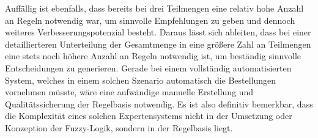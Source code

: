\documentclass[]{scrartcl}
\begin{document}
Auffällig ist ebenfalls, dass bereits bei drei Teilmengen eine relativ hohe Anzahl an Regeln notwendig war, um sinnvolle Empfehlungen zu geben und dennoch weiteres Verbesserungspotenzial besteht. Daraus lässt sich ableiten, dass bei einer detaillierteren Unterteilung der Gesamtmenge in eine größere Zahl an Teilmengen eine stets noch höhere Anzahl an Regeln notwendig ist, um beständig sinnvolle Entscheidungen zu generieren. Gerade bei einem vollständig automatisierten System, welches in einem solchen Szenario automatisch die Bestellungen vornehmen müsste, wäre eine aufwändige manuelle Erstellung und Qualitätssicherung der Regelbasis notwendig. Es ist also definitiv bemerkbar, dass die Komplexität eines solchen Expertensystems nicht in der Umsetzung oder Konzeption der Fuzzy-Logik, sondern in der Regelbasis liegt. 
\end{document}
